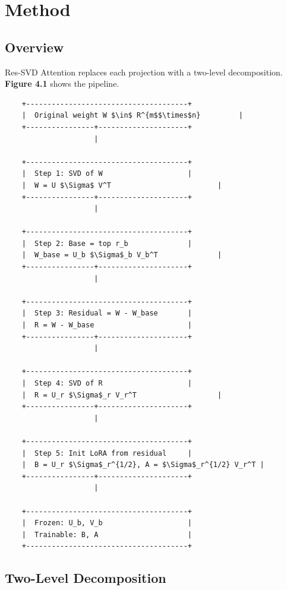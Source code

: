 \section{Method}

\subsection{Overview}

Res-SVD Attention replaces each projection with a two-level decomposition. 
\textbf{Figure 4.1} shows the pipeline.

\begin{lstlisting}
    +--------------------------------------+
    |  Original weight W $\in$ R^{m$$\times$n}         |
    +----------------+---------------------+
                     |
                      
    +--------------------------------------+
    |  Step 1: SVD of W                    |
    |  W = U $\Sigma$ V^T                         |
    +----------------+---------------------+
                     |
                      
    +--------------------------------------+
    |  Step 2: Base = top r_b              |
    |  W_base = U_b $\Sigma$_b V_b^T              |
    +----------------+---------------------+
                     |
                      
    +--------------------------------------+
    |  Step 3: Residual = W - W_base       |
    |  R = W - W_base                      |
    +----------------+---------------------+
                     |
                      
    +--------------------------------------+
    |  Step 4: SVD of R                    |
    |  R = U_r $\Sigma$_r V_r^T                   |
    +----------------+---------------------+
                     |
                      
    +--------------------------------------+
    |  Step 5: Init LoRA from residual     |
    |  B = U_r $\Sigma$_r^{1/2}, A = $\Sigma$_r^{1/2} V_r^T |
    +----------------+---------------------+
                     |
                      
    +--------------------------------------+
    |  Frozen: U_b, V_b                    |
    |  Trainable: B, A                     |
    +--------------------------------------+
\end{lstlisting}

\subsection{Two-Level Decomposition}

